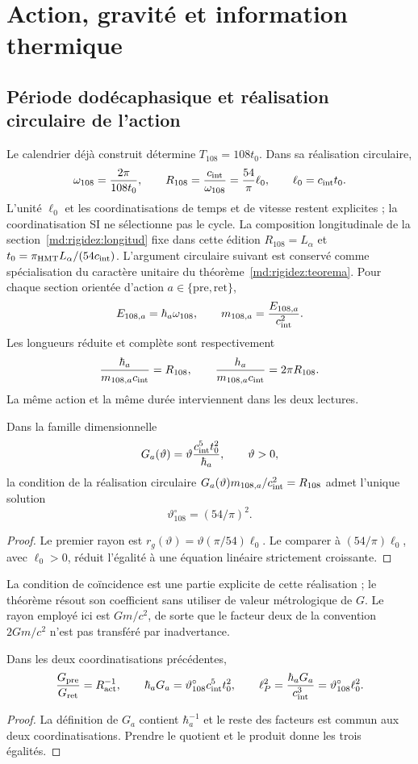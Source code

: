 \section{Action, gravité et information thermique}
\label{sec:gravity}
\subsection{Période dodécaphasique et réalisation circulaire de l'action}
Le calendrier déjà construit détermine $T_{108}=108t_0$.
Dans sa réalisation circulaire,
\[
\omega_{108}=\frac{2\pi}{108t_0},\qquad
R_{108}=\frac{c_{\rm int}}{\omega_{108}}
=\frac{54}{\pi}\ell_0,\qquad \ell_0=c_{\rm int}t_0.
\]
L’unité $\ell_0$ et les coordinatisations de temps et de vitesse restent
explicites ; la coordinatisation SI ne sélectionne pas le cycle.
La composition longitudinale de la section~\ref{md:rigidez:longitud}
fixe dans cette édition $R_{108}=L_\alpha$ et
$t_0=\pi_{\rm HMT}L_\alpha/(54c_{\rm int})$.
L’argument circulaire suivant est conservé comme spécialisation
du caractère unitaire du théorème~\ref{md:rigidez:teorema}.
Pour chaque section orientée d’action $a\in\{\mathrm{pre},\mathrm{ret}\}$,
\[
E_{108,a}=\hbar_a\omega_{108},\qquad
m_{108,a}=\frac{E_{108,a}}{c_{\rm int}^2}.
\]
Les longueurs réduite et complète sont respectivement
\[
\frac{\hbar_a}{m_{108,a}c_{\rm int}}=R_{108},
\qquad
\frac{h_a}{m_{108,a}c_{\rm int}}=2\pi R_{108}.
\]
La même action et la même durée interviennent dans les deux lectures.

\begin{proposition}
Dans la famille dimensionnelle
\[
G_a(\vartheta)=\vartheta\frac{c_{\rm int}^5t_0^2}{\hbar_a},
\qquad \vartheta>0,
\]
la condition de la réalisation circulaire
$G_a(\vartheta)m_{108,a}/c_{\rm int}^2=R_{108}$
admet l'unique solution
\[
\vartheta^\circ_{108}=(54/\pi)^2.
\]
\end{proposition}
\begin{proof}
Le premier rayon est
$r_g(\vartheta)=\vartheta(\pi/54)\ell_0$.
Le comparer à $(54/\pi)\ell_0$, avec $\ell_0>0$, réduit
l'égalité à une équation linéaire strictement croissante.
\end{proof}
La condition de coïncidence est une partie explicite de cette réalisation ;
le théorème résout son coefficient sans utiliser de valeur métrologique de $G$.
Le rayon employé ici est $Gm/c^2$, de sorte que le facteur deux
de la convention $2Gm/c^2$ n'est pas transféré par inadvertance.

\begin{proposition}
Dans les deux coordinatisations précédentes,
\[
\frac{G_{\rm pre}}{G_{\rm ret}}=R_{\rm act}^{-1},\qquad
\hbar_aG_a=\vartheta^\circ_{108}c_{\rm int}^5t_0^2,
\qquad
\ell_P^2=\frac{\hbar_aG_a}{c_{\rm int}^3}
=\vartheta^\circ_{108}\ell_0^2.
\]
\end{proposition}
\begin{proof}
La définition de $G_a$ contient $\hbar_a^{-1}$ et le reste des facteurs
est commun aux deux coordinatisations. Prendre le quotient et le produit donne
les trois égalités.
\end{proof}
